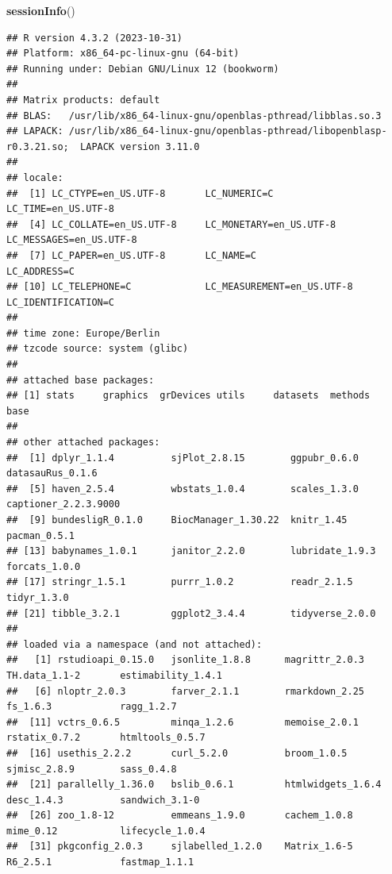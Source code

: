 \documentclass[
  12pt,
  oneside]{book}
\newenvironment{Shaded}{\begin{snugshade}}{\end{snugshade}}
\newcommand{\FunctionTok}[1]{\textcolor[rgb]{0.13,0.29,0.53}{\textbf{#1}}}
\newcommand{\NormalTok}[1]{#1}
\begin{document}
\begin{Shaded}
\begin{Highlighting}[]
\FunctionTok{sessionInfo}\NormalTok{()}
\end{Highlighting}
\end{Shaded}

\begin{verbatim}
## R version 4.3.2 (2023-10-31)
## Platform: x86_64-pc-linux-gnu (64-bit)
## Running under: Debian GNU/Linux 12 (bookworm)
## 
## Matrix products: default
## BLAS:   /usr/lib/x86_64-linux-gnu/openblas-pthread/libblas.so.3 
## LAPACK: /usr/lib/x86_64-linux-gnu/openblas-pthread/libopenblasp-r0.3.21.so;  LAPACK version 3.11.0
## 
## locale:
##  [1] LC_CTYPE=en_US.UTF-8       LC_NUMERIC=C               LC_TIME=en_US.UTF-8       
##  [4] LC_COLLATE=en_US.UTF-8     LC_MONETARY=en_US.UTF-8    LC_MESSAGES=en_US.UTF-8   
##  [7] LC_PAPER=en_US.UTF-8       LC_NAME=C                  LC_ADDRESS=C              
## [10] LC_TELEPHONE=C             LC_MEASUREMENT=en_US.UTF-8 LC_IDENTIFICATION=C       
## 
## time zone: Europe/Berlin
## tzcode source: system (glibc)
## 
## attached base packages:
## [1] stats     graphics  grDevices utils     datasets  methods   base     
## 
## other attached packages:
##  [1] dplyr_1.1.4          sjPlot_2.8.15        ggpubr_0.6.0         datasauRus_0.1.6    
##  [5] haven_2.5.4          wbstats_1.0.4        scales_1.3.0         captioner_2.2.3.9000
##  [9] bundesligR_0.1.0     BiocManager_1.30.22  knitr_1.45           pacman_0.5.1        
## [13] babynames_1.0.1      janitor_2.2.0        lubridate_1.9.3      forcats_1.0.0       
## [17] stringr_1.5.1        purrr_1.0.2          readr_2.1.5          tidyr_1.3.0         
## [21] tibble_3.2.1         ggplot2_3.4.4        tidyverse_2.0.0     
## 
## loaded via a namespace (and not attached):
##   [1] rstudioapi_0.15.0   jsonlite_1.8.8      magrittr_2.0.3      TH.data_1.1-2       estimability_1.4.1 
##   [6] nloptr_2.0.3        farver_2.1.1        rmarkdown_2.25      fs_1.6.3            ragg_1.2.7         
##  [11] vctrs_0.6.5         minqa_1.2.6         memoise_2.0.1       rstatix_0.7.2       htmltools_0.5.7    
##  [16] usethis_2.2.2       curl_5.2.0          broom_1.0.5         sjmisc_2.8.9        sass_0.4.8         
##  [21] parallelly_1.36.0   bslib_0.6.1         htmlwidgets_1.6.4   desc_1.4.3          sandwich_3.1-0     
##  [26] zoo_1.8-12          emmeans_1.9.0       cachem_1.0.8        mime_0.12           lifecycle_1.0.4    
##  [31] pkgconfig_2.0.3     sjlabelled_1.2.0    Matrix_1.6-5        R6_2.5.1            fastmap_1.1.1      

\end{verbatim}
\end{document}

